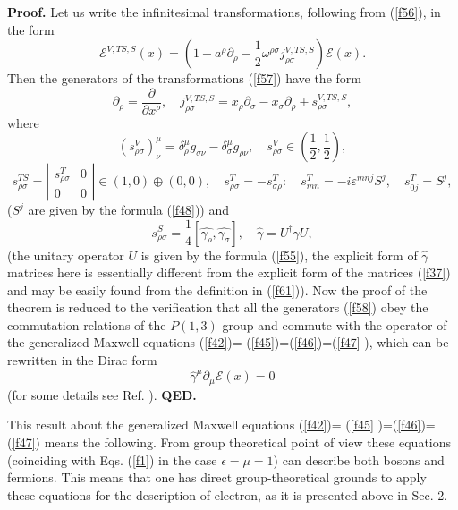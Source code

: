 \documentclass[a4paper,12pt]{article}
\begin{document}
\textbf{Proof.} Let us write the infinitesimal transformations, following
from (\ref{f56}), in the form
\begin{equation}
\mathcal{E}^{V,TS,S}(x)=(1-a^\rho \partial _\rho -\frac 12\omega ^{\rho
\sigma }j_{\rho \sigma }^{V,TS,S})\mathcal{E}(x).  \label{f57}
\end{equation}
Then the generators of the transformations (\ref{f57}) have the form
\begin{equation}
\partial _\rho =\frac \partial {\partial x^\rho },\quad j_{\rho \sigma
}^{V,TS,S}=x_\rho \partial _\sigma -x_\sigma \partial _\rho +s_{\rho \sigma
}^{V,TS,S},  \label{f58}
\end{equation}
where
\begin{equation}
(s_{\rho \sigma }^V)_\nu ^\mu =\delta _\rho ^\mu g_{\sigma \nu }-\delta
_\sigma ^\mu g_{\rho \nu },\quad s_{\rho \sigma }^V\in \left( \frac 12,\frac
12\right) ,  \label{f59}
\end{equation}
\begin{equation}
s_{\rho \sigma }^{TS}=\left|
\begin{array}{cc}
s_{\rho \sigma }^T & 0 \\
0 & 0
\end{array}
\right| \in (1,0)\oplus (0,0),\quad s_{\rho \sigma }^T=-s_{\sigma \rho
}^T:\quad s_{mn}^T=-i\varepsilon ^{mnj}S^j,\quad s_{0j}^T=S^j,  \label{f60}
\end{equation}
($S^j$ are given by the formula (\ref{f48})) and
\begin{equation}
s_{\rho \sigma }^S=\frac 14[\hat {{\gamma }_\rho },\hat {{\gamma }_\sigma
}],\quad \hat {{\gamma }}=U^{\dagger }\gamma U,  \label{f61}
\end{equation}
(the unitary operator $U$ is given by the formula (\ref{f55}), the explicit
form of $\hat \gamma $ matrices here is essentially different from the
explicit form of the matrices (\ref{f37}) and may be easily found from the
definition in (\ref{f61})). Now the proof of the theorem is reduced to the
verification that all the generators (\ref{f58}) obey the commutation
relations of the $P(1,3)$ group and commute with the operator of the
generalized Maxwell equations (\ref{f42})= (\ref{f45})=(\ref{f46})=(\ref{f47}%
), which can be rewritten in the Dirac form
\begin{equation}
\hat \gamma ^\mu \partial _\mu \mathcal{E}(x)=0  \label{f62}
\end{equation}
(for some details see Ref. \cite{SK}). \textbf{QED.}

This result about the generalized Maxwell equations (\ref{f42})= (\ref{f45}%
)=(\ref{f46})=(\ref{f47}) means the following. From group theoretical point
of view these equations (coinciding with Eqs. (\ref{f1}) in the case $%
\epsilon =\mu =1$) can describe both bosons and fermions. This means that
one has direct group-theoretical grounds to apply these equations for the
description of electron, as it is presented above in Sec. 2.
\end{document}

